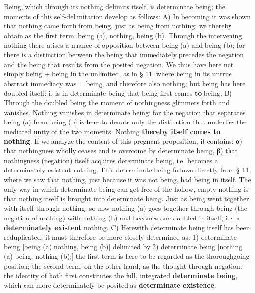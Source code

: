 \documentclass[12pt,a4paper,openany]{book}
\newcommand{\opage}[1]{\marginnote{\footnotesize\textit{[#1]}}}
\begin{document}
Being, which through its nothing delimits itself,
is determinate being; the moments of this self-delimitation
develop as follows: A) In becoming it was shown that
\setcounter{footnote}{0}%
\opage{9}nothing came forth from being, just as being from nothing; we
thereby obtain as the first term: being (a), nothing, being
(b). Through the intervening nothing there arises a
nuance of opposition between being (a) and being (b);
for there is a distinction between the being that immediately
precedes the negation and the being that results from
the posited negation. We thus have here not
simply being + being in the unlimited, as
in § 11, where being in its untrue abstract
immediacy was = being, and therefore also nothing;
but being has here doubled itself: it is in determinate being
that being first comes \textbf{to} being. B) Through
the doubled being the moment of nothingness glimmers
forth and vanishes. Nothing vanishes in determinate being:
for the negation that separates being (a) from being (b)
is here to denote only the distinction that underlies
the mediated unity of the two moments. Nothing
\textbf{thereby itself comes to nothing}. If we analyze the content of this
pregnant proposition, it contains: α) that nothingness wholly ceases and is overcome by determinate being,
β) that nothingness (negation) itself acquires determinate being,
i.e. becomes a determinately existent nothing. This determinate being follows
directly from § 11, where we saw that nothing, just because
it was not being, had being in itself. The only
way in which determinate being can get free of the hollow,
empty nothing is that nothing itself is brought into determinate being.
Just as being went together with itself through nothing,
so now nothing (a) goes together through
being (the negation of nothing) with nothing (b) and
becomes one doubled in itself, i.e. a \textbf{determinately existent} nothing. C) Herewith determinate being itself has been reduplicated; it
must therefore be more closely determined as: 1) determinate being
[being (a) nothing, being (b)] delimited by 2) determinate being
[nothing (a) being, nothing (b);] the first term is here
\setcounter{footnote}{0}%
\opage{10}to be regarded as the thoroughgoing position; the second term,
on the other hand, as the thought-through negation; the identity of both first constitutes the full, integrated \textbf{determinate being},
which can more determinately be posited as \textbf{determinate existence}.
\end{document}
